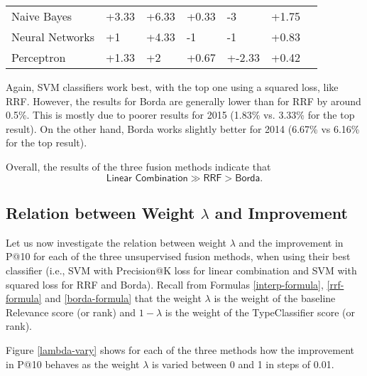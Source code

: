 \begin{table}
{\begin{tabular}{@{}lllllll@{}}
Naive Bayes                                              & +3.33           & +6.33              & +0.33           & -3                & +1.75          \\
Neural Networks                                         & +1              & +4.33              & -1             & -1                & +0.83          \\
Perceptron                                              & +1.33           & +2                 & +0.67           & +-2.33             & +0.42         \\\bottomrule
\end{tabular}%
}
\end{table}

Again, SVM classifiers work best, with the top one using a squared loss, like RRF.
However, the results for Borda are generally lower than for RRF by around 0.5\%. This is mostly due
to poorer results for 2015 (1.83\% vs. 3.33\% for the top result).
On the other hand, Borda works slightly better for 2014 (6.67\% vs 6.16\% for the top result).

Overall, the results of the three fusion methods indicate that \[\textsf{Linear Combination} \gg \textsf{RRF} > \textsf{Borda}.\]

\subsection{Relation between Weight $\lambda$ and Improvement}
Let us now investigate the relation between weight $\lambda$ and the improvement in P@10 for each of the three unsupervised
fusion methods, when using their best classifier (i.e., SVM with Precision@K loss for linear combination
and SVM with squared loss for RRF and Borda).
Recall from Formulas \ref{interp-formula}, \ref{rrf-formula} and \ref{borda-formula} that the weight $\lambda$ is the
weight of the baseline \textsf{Relevance} score (or rank) and $1-\lambda$ is the weight of the \textsf{TypeClassifier} score (or rank).

Figure \ref{lambda-vary} shows for each of the three methods
how the improvement in P@10 behaves as the weight $\lambda$ is varied between 0 and 1 in steps of 0.01.

